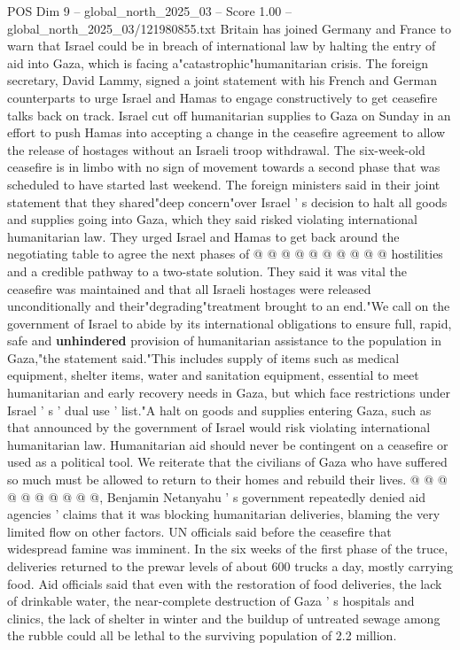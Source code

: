 \begin{textsample}{POS Dim 9 – global\_north\_2025\_03 – Score 1.00 – global\_north\_2025\_03/121980855.txt}  \label{ex:f9_pos_384}
Britain has joined Germany and France to warn that Israel could be in breach of international law by halting the entry of aid into Gaza, which is facing a"catastrophic"humanitarian crisis.
The foreign secretary, David Lammy, signed a joint statement with his French and German counterparts to urge Israel and Hamas to engage constructively to get ceasefire talks back on track.
Israel cut off humanitarian supplies to Gaza on Sunday in an effort to push Hamas into accepting a change in the ceasefire agreement to allow the release of hostages without an Israeli troop withdrawal.
The six-week-old ceasefire is in limbo with no sign of movement towards a second phase that was scheduled to have started last weekend.
The foreign ministers said in their joint statement that they shared"deep concern"over Israel ' s decision to halt all goods and supplies going into Gaza, which they said risked violating international humanitarian law.
They urged Israel and Hamas to get back around the negotiating table to agree the next phases of @ @ @ @ @ @ @ @ @ @ hostilities and a credible pathway to a two-state solution.
They said it was vital the ceasefire was maintained and that all Israeli hostages were released unconditionally and their"degrading"treatment brought to an end."We call on the government of Israel to abide by its international obligations to ensure full, rapid, safe and \textbf{unhindered} provision of humanitarian assistance to the population in Gaza,"the statement said."This includes supply of items such as medical equipment, shelter items, water and sanitation equipment, essential to meet humanitarian and early recovery needs in Gaza, but which face restrictions under Israel ' s ' dual use ' list."A halt on goods and supplies entering Gaza, such as that announced by the government of Israel would risk violating international humanitarian law.
Humanitarian aid should never be contingent on a ceasefire or used as a political tool.
We reiterate that the civilians of Gaza who have suffered so much must be allowed to return to their homes and rebuild their lives. @ @ @ @ @ @ @ @ @ @, Benjamin Netanyahu ' s government repeatedly denied aid agencies ' claims that it was blocking humanitarian deliveries, blaming the very limited flow on other factors.
UN officials said before the ceasefire that widespread famine was imminent.
In the six weeks of the first phase of the truce, deliveries returned to the prewar levels of about 600 trucks a day, mostly carrying food.
Aid officials said that even with the restoration of food deliveries, the lack of drinkable water, the near-complete destruction of Gaza ' s hospitals and clinics, the lack of shelter in winter and the buildup of untreated sewage among the rubble could all be lethal to the surviving population of 2.2 million.

\end{textsample}
